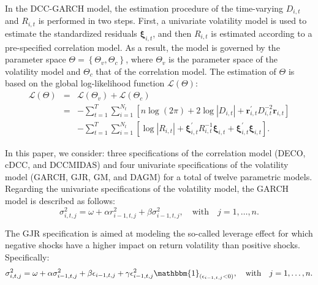 In the DCC-GARCH model, the estimation procedure of the time-varying $D_{i,t}$ and $R_{i,t}$  is performed in two steps.
First, a univariate volatility model is used to estimate the standardized residuals $\bm{\xi}_{i,t}$, and then $R_{i,t}$ is estimated according to a pre-specified correlation model. 
As a result, the model is governed by the parameter space $\Theta=\left\lbrace \Theta_v, \Theta_c \right\rbrace$, where $\Theta_v$ is the parameter space of the volatility model and $\Theta_c$ that of the correlation model.
The estimation of $\Theta$ is based on the global log-likelihood function $\mathcal{L}(\Theta)$:
\begin{eqnarray}
	\mathcal{L}(\Theta) &=& \mathcal{L}(\Theta_v) + \mathcal{L}(\Theta_c)\\
	&=& -\sum_{t=1}^T   \sum_{i=1}^{N_t} \left[ n \log(2 \pi) + 2 \log |D_{i,t}| + \bm{r}_{i,t}^{'} D_{i,t}^{-2} \bm{r}_{i,t} \right] \nonumber \\
	& & -\sum_{t=1}^T   \sum_{i=1}^{N_t} \left[ \log |R_{i,t}| + \bm{\xi}_{i,t}^{'}R_{i,t}^{-1}\bm{\xi}_{i,t} + \bm{\xi}_{i,t}^{'}\bm{\xi}_{i,t} \right].
\end{eqnarray}

In this paper, we consider: three specifications of the correlation model (DECO, cDCC, and DCCMIDAS) and four univariate specifications of the volatility model (GARCH, {GJR, GM, and DAGM}) for a total of twelve parametric models. Regarding the univariate specifications of the volatility model, the GARCH model is described as follows:
\begin{equation}
	\sigma_{i,t,j}^2=\omega + \alpha r_{i-1,t,j}^2 + \beta \sigma_{i-1,t,j}^2, \quad \text{with} \quad j=1,\dots,n \label{eq:garch}.
\end{equation}

The GJR specification is aimed at modeling the so-called leverage effect for which negative shocks have a higher impact on return volatility than positive shocks. Specifically:
\begin{eqnarray}
	\sigma_{i,t,j}^2=\omega + \alpha \sigma_{i-1,t,j}^2 + \beta \epsilon_{i-1,t,j} + \gamma \epsilon_{i-1,t,j}^2 \mathbbm{1}_{\left(  \epsilon_{i-1,t,j} < 0 \right)}, \quad \text{with} \quad j=1,\dots,n \label{eq:gjrgarch}.
\end{eqnarray}

